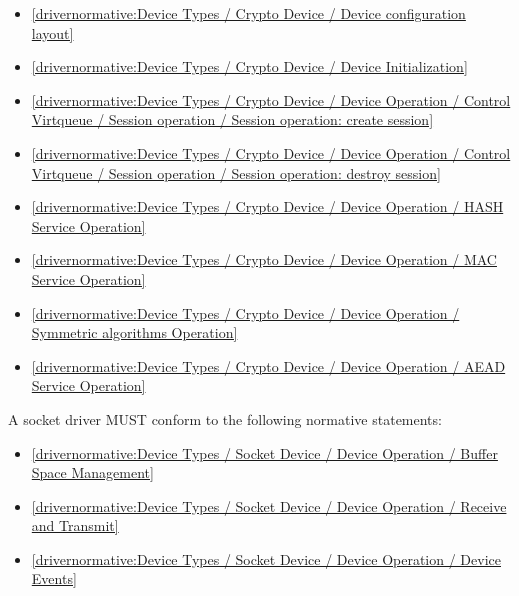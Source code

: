 \begin{itemize}
\item \ref{drivernormative:Device Types / Crypto Device / Device configuration layout}
\item \ref{drivernormative:Device Types / Crypto Device / Device Initialization}
\item \ref{drivernormative:Device Types / Crypto Device / Device Operation / Control Virtqueue / Session operation / Session operation: create session}
\item \ref{drivernormative:Device Types / Crypto Device / Device Operation / Control Virtqueue / Session operation / Session operation: destroy session}
\item \ref{drivernormative:Device Types / Crypto Device / Device Operation / HASH Service Operation}
\item \ref{drivernormative:Device Types / Crypto Device / Device Operation / MAC Service Operation}
\item \ref{drivernormative:Device Types / Crypto Device / Device Operation / Symmetric algorithms Operation}
\item \ref{drivernormative:Device Types / Crypto Device / Device Operation / AEAD Service Operation}
\end{itemize}

\label{sec:Conformance / Driver Conformance / Socket Driver Conformance}

A socket driver MUST conform to the following normative statements:

\begin{itemize}
\item \ref{drivernormative:Device Types / Socket Device / Device Operation / Buffer Space Management}
\item \ref{drivernormative:Device Types / Socket Device / Device Operation / Receive and Transmit}
\item \ref{drivernormative:Device Types / Socket Device / Device Operation / Device Events}
\end{itemize}

\label{sec:Conformance / Driver Conformance / RPMB Driver Conformance}


